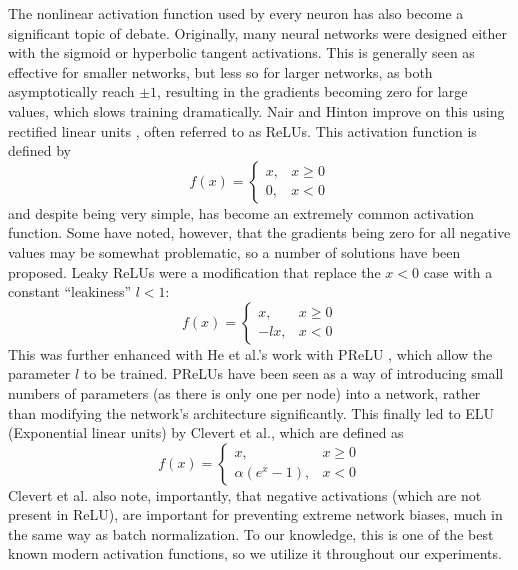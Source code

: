 The nonlinear activation function used by every neuron has also become a significant topic of debate.
Originally, many neural networks were designed either with the sigmoid or hyperbolic tangent activations.
This is generally seen as effective for smaller networks, but less so for larger networks, as both asymptotically reach $\pm 1$, resulting in the gradients becoming zero for large values, which slows training dramatically.
Nair and Hinton improve on this using rectified linear units \cite{nair2010rectified}, often referred to as ReLUs.
This activation function is defined by 
\[f(x) = \begin{cases}x, & x \geq 0 \\ 0, & x < 0\end{cases}\]
and despite being very simple, has become an extremely common activation function.
Some have noted, however, that the gradients being zero for all negative values may be somewhat problematic, so a number of solutions have been proposed.
Leaky ReLUs \cite{maas2013rectifier} were a modification that replace the $x < 0$ case with a constant ``leakiness'' $l < 1$:
\[f(x) = \begin{cases}x, & x \geq 0 \\-lx, & x < 0\end{cases}\]
This was further enhanced with He et al.'s work with PReLU \cite{he2015delving}, which allow the parameter $l$ to be trained.
PReLUs have been seen as a way of introducing small numbers of parameters (as there is only one per node) into a network, rather than modifying the network's architecture significantly.
This finally led to ELU (Exponential linear units) by Clevert et al., which are defined as
\[f(x) = \begin{cases}x, & x \geq 0 \\\alpha (e^x -1), & x < 0\end{cases}\]
Clevert et al. also note, importantly, that negative activations (which are not present in ReLU), are important for preventing extreme network biases, much in the same way as batch normalization.
To our knowledge, this is one of the best known modern activation functions, so we utilize it throughout our experiments.

